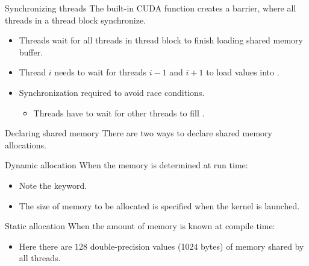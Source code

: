 \documentclass[aspectratio=43]{beamer}
\begin{document}
\begin{frame}[fragile]{Synchronizing threads}
    The built-in CUDA function  creates a barrier, where all threads in a thread block synchronize.
    \begin{itemize}
        \item Threads wait for all threads in thread block to finish loading shared memory buffer.
        \item Thread $i$ needs to wait for threads $i-1$ and $i+1$ to load values into .
        \item Synchronization required to avoid race conditions.
        \begin{itemize}
            \item Threads have to wait for other threads to fill .
        \end{itemize}
    \end{itemize}
\end{frame}

\begin{frame}[fragile]{Declaring shared memory}
    There are two ways to declare shared memory allocations.

    \begin{info}{Dynamic allocation}
        When the memory is determined at run time:
        \centering {}
        \begin{itemize}
            \item Note the  keyword.
            \item The size of memory to be allocated is specified when the kernel is launched.
        \end{itemize}
    \end{info}

    \begin{info}{Static allocation}
        When the amount of memory is known at compile time:
        \centering {}
        \begin{itemize}
            \item Here there are 128 double-precision values (1024 bytes) of memory shared by all threads.
        \end{itemize}
    \end{info}

\end{frame}
\end{document}
